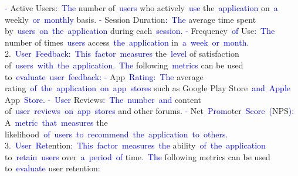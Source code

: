 \documentclass{article}
\begin{document}
\begin{tcolorbox}[colframe=black,colback=white]
{}\textcolor{blue}{-} Active Users\textcolor{blue}{:}\textcolor{blue}{~The} number of\textcolor{blue}{~users} who actively\textcolor{blue}{~use} the\textcolor{blue}{~application} on\textcolor{blue}{~a} weekly\textcolor{blue}{~or}\textcolor{blue}{~monthly} basis\textcolor{blue}{.
}\textcolor{blue}{-} Session Duration\textcolor{blue}{:}\textcolor{blue}{~The} average time spent by\textcolor{blue}{~users}\textcolor{blue}{~on}\textcolor{blue}{~the}\textcolor{blue}{~application} during each\textcolor{blue}{~session}\textcolor{blue}{.
}\textcolor{blue}{-} Frequency\textcolor{blue}{~of} Use\textcolor{blue}{:}\textcolor{blue}{~The} number of times\textcolor{blue}{~users} access\textcolor{blue}{~the}\textcolor{blue}{~application} in\textcolor{blue}{~a}\textcolor{blue}{~week}\textcolor{blue}{~or}\textcolor{blue}{~month}\textcolor{blue}{.
}2.\textcolor{blue}{~User}\textcolor{blue}{~Feedback}\textcolor{blue}{:}\textcolor{blue}{~This}\textcolor{blue}{~factor}\textcolor{blue}{~measures} the\textcolor{blue}{~level} of satisfaction of\textcolor{blue}{~users}\textcolor{blue}{~with}\textcolor{blue}{~the}\textcolor{blue}{~application}\textcolor{blue}{.}\textcolor{blue}{~The} following\textcolor{blue}{~metrics} can be used to\textcolor{blue}{~evaluate}\textcolor{blue}{~user}\textcolor{blue}{~feedback}\textcolor{blue}{:
}\textcolor{blue}{-} App\textcolor{blue}{~Rating}\textcolor{blue}{:}\textcolor{blue}{~The} average rating\textcolor{blue}{~of}\textcolor{blue}{~the}\textcolor{blue}{~application}\textcolor{blue}{~on}\textcolor{blue}{~app}\textcolor{blue}{~stores} such as Google Play Store\textcolor{blue}{~and}\textcolor{blue}{~Apple} App\textcolor{blue}{~Store}\textcolor{blue}{.
}-\textcolor{blue}{~User} Reviews\textcolor{blue}{:}\textcolor{blue}{~The}\textcolor{blue}{~number}\textcolor{blue}{~and} content of\textcolor{blue}{~user}\textcolor{blue}{~reviews}\textcolor{blue}{~on}\textcolor{blue}{~app}\textcolor{blue}{~stores} and other forums.
\textcolor{blue}{-} Net\textcolor{blue}{~Prom}oter\textcolor{blue}{~Score}\textcolor{blue}{~(}NPS\textcolor{blue}{):} A\textcolor{blue}{~metric}\textcolor{blue}{~that}\textcolor{blue}{~measures} the likelihood\textcolor{blue}{~of}\textcolor{blue}{~users}\textcolor{blue}{~to}\textcolor{blue}{~recommend}\textcolor{blue}{~the}\textcolor{blue}{~application}\textcolor{blue}{~to}\textcolor{blue}{~others}\textcolor{blue}{.
}3.\textcolor{blue}{~User}\textcolor{blue}{~Ret}ention\textcolor{blue}{:}\textcolor{blue}{~This}\textcolor{blue}{~factor}\textcolor{blue}{~measures}\textcolor{blue}{~the} ability\textcolor{blue}{~of}\textcolor{blue}{~the}\textcolor{blue}{~application} to\textcolor{blue}{~retain}\textcolor{blue}{~users} over\textcolor{blue}{~a}\textcolor{blue}{~period}\textcolor{blue}{~of} time\textcolor{blue}{.}\textcolor{blue}{~The} following metrics can be used to\textcolor{blue}{~evaluate} user retention\textcolor{blue}{:
}
\end{tcolorbox}
\end{document}
